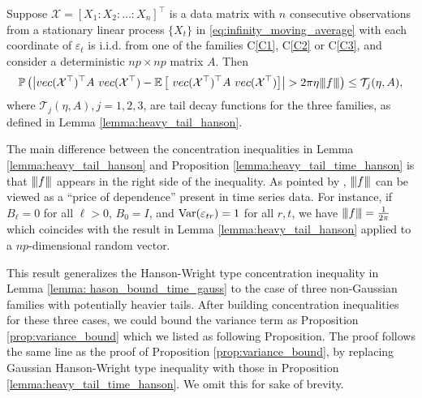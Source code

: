 \begin{prop}
\label{lemma:heavy_tail_time_hanson} 
Suppose $\mathcal{X} = [X_1:X_2:\ldots:X_n]^\top$ is a data matrix with $n$ consecutive observations from  a stationary linear process  $\{X_t\}$ in  \eqref{eq:infinity_moving_average}  with each coordinate of $\varepsilon_t$ is i.i.d. from one of the families C\ref{C1}, C\ref{C2} or  C\ref{C3}, and consider a deterministic $np \times np$ matrix $A$. Then 
\begin{equation}
\begin{aligned}
\mathbb{P}\left(\left|vec(\mathcal{X}^\top)^\top A ~vec(\mathcal{X}^\top) - \mathbb{E} \left[~vec(\mathcal{X}^\top)^\top A ~vec(\mathcal{X}^\top)\right]\right| >2\pi
\eta {\left\vert\kern-0.25ex\left\vert\kern-0.25ex\left\vert f \right\vert\kern-0.25ex\right\vert\kern-0.25ex\right\vert} \right) \le \mathcal{T}_j(\eta, A), \nonumber
\end{aligned}
\end{equation}
where $\mathcal{T}_j(\eta, A), j=1,2,3$, are tail decay functions for the three families, as defined in Lemma \ref{lemma:heavy_tail_hanson}.
\end{prop}
\begin{remark}
The main difference between the  concentration inequalities in Lemma \ref{lemma:heavy_tail_hanson} and Proposition  \ref{lemma:heavy_tail_time_hanson} is that ${\left\vert\kern-0.25ex\left\vert\kern-0.25ex\left\vert f \right\vert\kern-0.25ex\right\vert\kern-0.25ex\right\vert}$ appears in the right side of the inequality. As pointed by \cite{Basu2015}, ${\left\vert\kern-0.25ex\left\vert\kern-0.25ex\left\vert f \right\vert\kern-0.25ex\right\vert\kern-0.25ex\right\vert}$ can be viewed as a ``price of dependence'' present in time series data. For instance, if $B_\ell = 0$ for all $\ell > 0$, $B_0 = I$, and $\mbox{Var}(\varepsilon_{tr}) = 1$ for all $r, t$, we have  ${\left\vert\kern-0.25ex\left\vert\kern-0.25ex\left\vert f \right\vert\kern-0.25ex\right\vert\kern-0.25ex\right\vert} = \frac{1}{2\pi}$ which coincides with the result in Lemma \ref{lemma:heavy_tail_hanson} applied to a $np$-dimensional random vector. 
\end{remark}

This result generalizes the Hanson-Wright type concentration inequality in Lemma \ref{lemma: hason_bound_time_gauss} to the case of three non-Gaussian families with potentially heavier tails.
After building concentration inequalities for these three cases, we could bound the variance term as Proposition \ref{prop:variance_bound} which we listed as following Proposition. 
The proof follows the same line as the proof of Proposition \ref{prop:variance_bound}, by replacing Gaussian Hanson-Wright type inequality with those in Proposition \ref{lemma:heavy_tail_time_hanson}. We omit this for sake of brevity.



